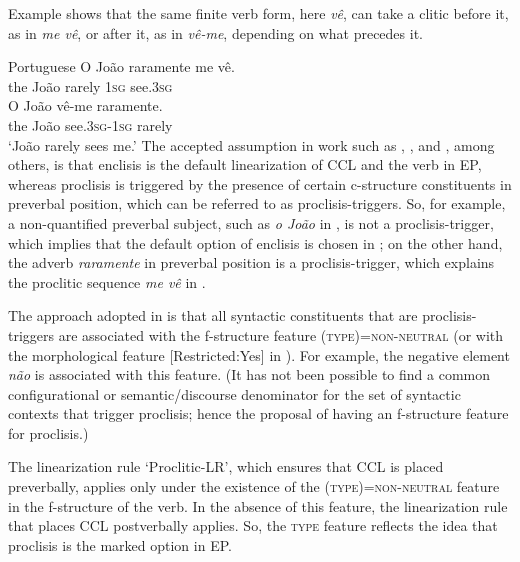 \documentclass[output=paper,hidelinks]{langscibook}
\begin{document}
Example  shows that the same finite verb form, here \textit{vê}, can take a clitic before it, as in \textit{me vê}, or after it, as in \textit{vê-me}, depending on what precedes it. 

\ea\label{ex:Romance:8} Portuguese \citep{LuisOtoguro2004}
\ea\label{ex:Romance:8a}
\gll
O João raramente me vê.\\
the João rarely 1\textsc{sg} see.3\textsc{sg}\\
\ex\label{ex:Romance:8b}
\gll
O João vê-me raramente.\\
the João see.3\textsc{sg}{}-1\textsc{sg} rarely\\
\glt   `João rarely sees me.'
\z\z
The accepted assumption in work such as \citet{LuisSadler2003}, \citet{LuisOtoguro2004,LuisOtoguro2005}, and \citet{LuisSpencer2005}, among others, is that enclisis is the default linearization of CCL and the verb in EP, whereas proclisis is triggered by the presence of certain c-structure constituents in preverbal position, which can be referred to as proclisis-triggers. So, for example, a non-quantified preverbal subject, such as \textit{o João} in , is not a proclisis-trigger, which implies that the default option of enclisis is chosen in ; on the other hand, the adverb \textit{raramente} in preverbal position is a proclisis-trigger, which explains the proclitic sequence \textit{me vê} in .

The approach adopted in \citet{LuisSadler2003} is that all syntactic constituents that are proclisis-triggers are associated with the f-structure feature (\UP\textsc{type})=\textsc{non-neutral} (or with the morphological feature [Restricted:Yes] in \citealt{LuisOtoguro2004}). For example, the negative element \textit{não} is associated with this feature. (It has not been possible to find a common configurational or semantic/discourse denominator for the set of syntactic contexts that trigger proclisis; hence the proposal of having an f-structure feature for proclisis.) 

The linearization rule `Proclitic-LR', which ensures that CCL is placed preverbally, applies only under the existence of the (\UP\textsc{type})=\textsc{non-neutral} feature in the f-structure of the verb. In the absence of this feature, the linearization rule that places CCL postverbally applies. So, the \textsc{type} feature reflects the idea that proclisis is the marked option in EP.
\end{document}
